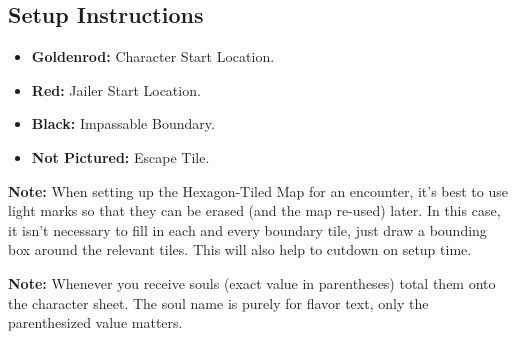\begin{center}
\end{center}

\subsection*{Setup Instructions}
\begin{itemize}
\item \textbf{Goldenrod:} Character Start Location.
\item \textbf{Red:} Jailer Start Location.
\item \textbf{Black:} Impassable Boundary.
\item \textbf{Not Pictured:} Escape Tile.
\end{itemize}

\begin{tcolorbox}
\textbf{Note:} When setting up the Hexagon-Tiled Map for an encounter, it’s best to use light marks so that they can be erased (and the map re-used) later. In this case, it isn’t necessary to fill in each and every boundary tile, just draw a bounding box around the relevant tiles. This will also help to cutdown on setup time.
\end{tcolorbox}

\pagebreak

\begin{tcolorbox}
\textbf{Note:} Whenever you receive souls (exact value in parentheses) total them onto the character sheet. The soul name is purely for flavor text, only the parenthesized value matters.
\end{tcolorbox}

